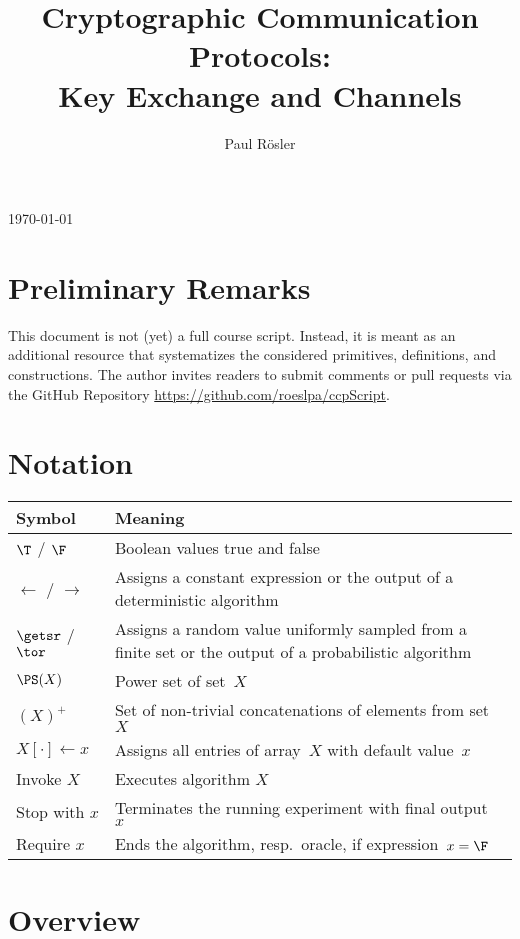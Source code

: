 \documentclass[a4paper,orivec]{llncs}
\title{Cryptographic Communication Protocols:\\Key Exchange and Channels}
\author{Paul Rösler}
\institute{FAU Erlangen-Nürnberg}
\begin{document}
\maketitle
\begin{center}
    \today
\end{center}

\begingroup
\let\clearpage\relax
\tableofcontents
\endgroup

\section{Preliminary Remarks}
This document is not (yet) a full course script.
Instead, it is meant as an additional resource that systematizes the considered primitives, definitions, and constructions.
The author invites readers to submit comments or pull requests via the GitHub Repository \url{https://github.com/roeslpa/ccpScript}.


\section{Notation}

\begin{tabular}{|l|p{13cm}|}\hline
    \textbf{Symbol} & \textbf{Meaning}\\\hline
    $\T$ / $\F$ & Boolean values true and false\\
    $\gets$ / $\to$ & Assigns a constant expression or the output of a deterministic algorithm\\
    $\getsr$ / $\tor$ & Assigns a random value uniformly sampled from a finite set or the output of a probabilistic algorithm\\
    $\PS(X)$ & Power set of set~$X$\\
    $(X)^+$ & Set of non-trivial concatenations of elements from set~$X$\\
    $X[\cdot]\gets x$ & Assigns all entries of array~$X$ with default value~$x$\\
    Invoke $X$ & Executes algorithm $X$\\
    Stop with $x$ & Terminates the running experiment with final output~$x$\\
    Require $x$ & Ends the algorithm, resp.~oracle, if expression~$x=\F$\\\hline
\end{tabular}

\section{Overview}
\end{document}
